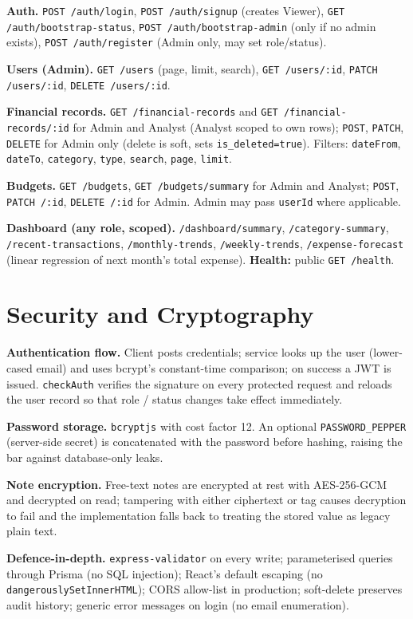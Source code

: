 \documentclass[11pt,a4paper]{article}
\newcommand{\code}[1]{\texttt{\small #1}}
\begin{document}
\textbf{Auth.} \code{POST /auth/login}, \code{POST /auth/signup}
(creates Viewer), \code{GET /auth/bootstrap-status},
\code{POST /auth/bootstrap-admin} (only if no admin exists),
\code{POST /auth/register} (Admin only, may set role/status).

\textbf{Users (Admin).} \code{GET /users} (page, limit, search),
\code{GET /users/:id}, \code{PATCH /users/:id}, \code{DELETE /users/:id}.

\textbf{Financial records.} \code{GET /financial-records} and
\code{GET /financial-records/:id} for Admin and Analyst (Analyst
scoped to own rows); \code{POST}, \code{PATCH}, \code{DELETE} for Admin
only (delete is soft, sets \code{is\_deleted=true}). Filters:
\code{dateFrom}, \code{dateTo}, \code{category}, \code{type},
\code{search}, \code{page}, \code{limit}.

\textbf{Budgets.} \code{GET /budgets}, \code{GET /budgets/summary} for
Admin and Analyst; \code{POST}, \code{PATCH /:id}, \code{DELETE /:id}
for Admin. Admin may pass \code{userId} where applicable.

\textbf{Dashboard (any role, scoped).}
\code{/dashboard/summary}, \code{/category-summary},
\code{/recent-transactions}, \code{/monthly-trends},
\code{/weekly-trends}, \code{/expense-forecast} (linear regression of
next month's total expense). \textbf{Health:} public \code{GET /health}.

\section{Security and Cryptography}
\textbf{Authentication flow.} Client posts credentials; service looks
up the user (lower-cased email) and uses bcrypt's constant-time
comparison; on success a JWT is issued. \code{checkAuth} verifies the
signature on every protected request and reloads the user record so
that role / status changes take effect immediately.

\textbf{Password storage.} \code{bcryptjs} with cost factor 12. An
optional \code{PASSWORD\_PEPPER} (server-side secret) is concatenated
with the password before hashing, raising the bar against database-only
leaks.

\textbf{Note encryption.} Free-text notes are encrypted at rest with
AES-256-GCM and decrypted on read; tampering with either ciphertext or
tag causes decryption to fail and the implementation falls back to
treating the stored value as legacy plain text.

\textbf{Defence-in-depth.} \code{express-validator} on every write;
parameterised queries through Prisma (no SQL injection); React's
default escaping (no \code{dangerouslySetInnerHTML}); CORS allow-list
in production; soft-delete preserves audit history; generic error
messages on login (no email enumeration).
\end{document}
